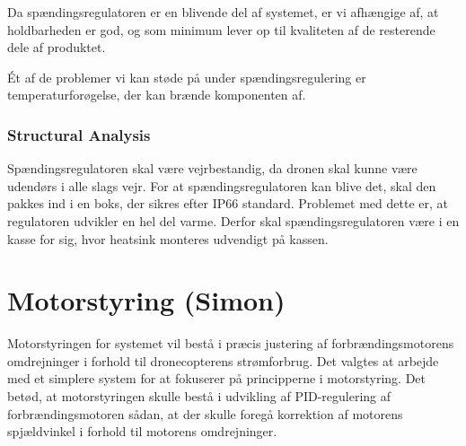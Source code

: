 Da spændingsregulatoren er en blivende del af systemet, er vi afhængige af, at holdbarheden er god, og som minimum lever op til kvaliteten af de resterende dele af produktet.

Ét af de problemer vi kan støde på under spændingsregulering er temperaturforøgelse, der kan brænde komponenten af.

\subsubsection{Structural Analysis}
\label{sec:generel-analyse-2}

Spændingsregulatoren skal være vejrbestandig, da dronen skal kunne være udendørs i alle slags vejr. For at spændingsregulatoren kan blive det, skal den pakkes ind i en boks, der sikres efter IP66 standard. Problemet med dette er, at regulatoren udvikler en hel del varme. Derfor skal spændingsregulatoren være i en kasse for sig, hvor heatsink monteres udvendigt på kassen.

\section{Motorstyring (Simon)}
\label{sec:motorstyring}

Motorstyringen for systemet vil bestå i præcis justering af forbrændingsmotorens omdrejninger i forhold til dronecopterens strømforbrug. Det valgtes at arbejde med et simplere system for at fokuserer på principperne i motorstyring. Det betød, at motorstyringen skulle bestå i udvikling af PID-regulering af forbrændingsmotoren sådan, at der skulle foregå korrektion af motorens spjældvinkel i forhold til motorens omdrejninger.




